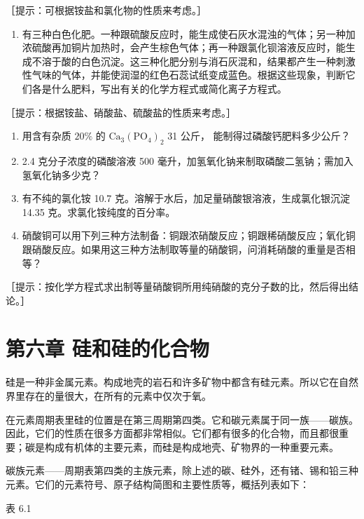 ［提示：可根据铵盐和氯化物的性质来考虑。］

\begin{enumerate}[start=5]
\item
  有三种白色化肥。一种跟硫酸反应时，能生成使石灰水混浊的气体；另一种加浓硫酸再加铜片加热时，会产生棕色气体；再一种跟氯化钡溶液反应时，能生成不溶于酸的白色沉淀。这三种化肥分别与消石灰混和，结果都产生一种刺激性气味的气体，并能使润湿的红色石蕊试纸变成蓝色。根据这些现象，判断它们各是什么肥料，写出有关的化学方程式或简化离子方程式。
\end{enumerate}

［提示：根据铵盐、硝酸盐、硫酸盐的性质来考虑。］

\begin{enumerate}[start=6]
\item
  用含有杂质 \(20\%\) 的 \(\mathrm{Ca}_{3}(\mathrm{PO}_{4})_{2}\) 31
  公斤， 能制得过磷酸钙肥料多少公斤？
\item
  2.4 克分子浓度的磷酸溶液 500
  毫升，加氢氧化钠来制取磷酸二氢钠；需加入氢氧化钠多少克？
\item
  有不纯的氯化铵 10.7 克。溶解于水后，加足量硝酸银溶液，生成氯化银沉淀
  14.35 克。求氯化铵纯度的百分率。
\item
  硝酸铜可以用下列三种方法制备：铜跟浓硝酸反应；铜跟稀硝酸反应；氧化铜跟硝酸反应。如果用这三种方法制取等量的硝酸铜，问消耗硝酸的重量是否相等？
\end{enumerate}

［提示：按化学方程式求出制等量硝酸铜所用纯硝酸的克分子数的比，然后得出结论。］

\chapter{第六章 硅和硅的化合物}

硅是一种非金属元素。构成地壳的岩石和许多矿物中都含有硅元素。所以它在自然界里存在的量很大，在所有的元素中仅次于氧。

在元素周期表里硅的位置是在第三周期第四类。它和碳元素属于同一族------碳族。因此，它们的性质在很多方面都非常相似。它们都有很多的化合物，而且都很重要；碳是构成有机体的主要元素，而硅是构成地壳、矿物界的一种重要元素。

碳族元素------周期表第四类的主族元素，除上述的碳、硅外，还有锗、锡和铅三种元素。它们的元素符号、原子结构简图和主要性质等，概括列表如下：

表 6.1

